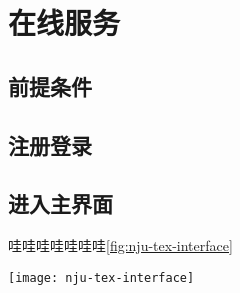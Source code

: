 \section{在线服务}
\label{sec:online}

\subsection{前提条件}

\subsection{注册登录}

\subsection{进入主界面}

哇哇哇哇哇哇哇\ref{fig:nju-tex-interface}

\begin{figure*}[htbp]
  \caption{界面}
  \label{fig:nju-tex-interface}
  \texttt{[image: nju-tex-interface]}
\end{figure*}
